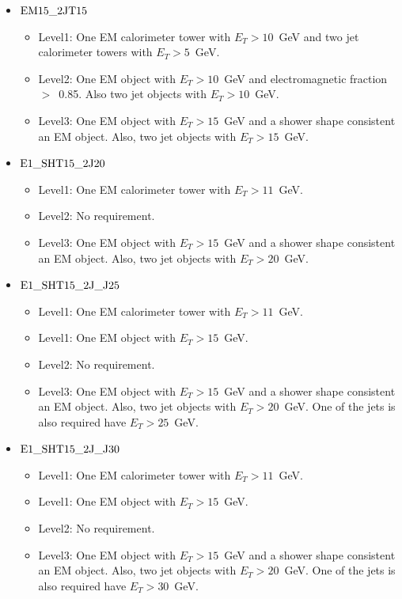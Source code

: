 \begin{itemize}
\item $\rm{EM15\_2JT15}$
\begin{itemize}
\item Level1: One EM calorimeter tower with $E_{T}>10$~GeV and two jet calorimeter towers with $E_{T}>5$~GeV.
\item Level2: One EM object with $E_{T}>10$~GeV and electromagnetic fraction $>$~0.85. Also two jet objects with $E_{T}>10$~GeV.
\item Level3: One EM object with $E_{T}>15$~GeV and a shower shape consistent an EM object. Also, two jet objects with $E_{T}>15$~GeV.
\end{itemize}
\item $\rm{E1\_SHT15\_2J20}$
\begin{itemize}
\item Level1: One EM calorimeter tower with $E_{T}>11$~GeV.
\item Level2: No requirement.
\item Level3: One EM object with $E_{T}>15$~GeV and a shower shape consistent an EM object. Also, two jet objects with $E_{T}>20$~GeV.
\end{itemize}
\item $\rm{E1\_SHT15\_2J\_J25}$
\begin{itemize}
\item Level1: One EM calorimeter tower with $E_{T}>11$~GeV.
\item Level1: One EM object with $E_{T}>15$~GeV.
\item Level2: No requirement.
\item Level3: One EM object with $E_{T}>15$~GeV and a shower shape consistent an EM object. Also, two jet objects with $E_{T}>20$~GeV. One of the jets is also required have $E_{T}>25$~GeV.
\end{itemize}
\item $\rm{E1\_SHT15\_2J\_J30}$
\begin{itemize}
\item Level1: One EM calorimeter tower with $E_{T}>11$~GeV.
\item Level1: One EM object with $E_{T}>15$~GeV.
\item Level2: No requirement.
\item Level3: One EM object with $E_{T}>15$~GeV and a shower shape consistent an EM object. Also, two jet objects with $E_{T}>20$~GeV. One of the jets is also required have $E_{T}>30$~GeV.
\end{itemize}
\end{itemize}

